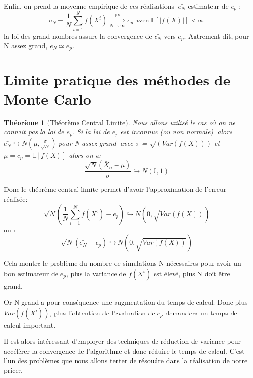 \documentclass[12pt]{report}
\newtheorem{theo}{Théorème}[section]
\begin{document}
Enfin, on prend la moyenne empirique de ces réalisations, $\bar{e_N}$ estimateur de $e_p$ :
\begin{equation}
	\bar{e_N}=\frac{1}{N}\sum_{i=1}^{N} f(X^i) \xrightarrow[N\rightarrow{\infty}]{\text{p.s}} e_p \text{~avec~} \mathbb{E}[|f(X)|]<\infty
\end{equation}
la loi des grand nombres assure la convergence de $\bar{e_N}$ vers $e_p$.
Autrement dit, pour N assez grand, $\bar{e_N} \simeq e_p$.

\section{Limite pratique des méthodes de Monte Carlo}

\begin{theo}[Théorème Central Limite]\label{TCL}
	Nous allons utilisé le cas où on ne connait pas la loi de $e_p$.
	Si la loi de $e_p$ est inconnue (ou non normale), alors $\bar{e_N}\hookrightarrow N(\mu,\frac{\sigma}{\sqrt{N}})$ pour N assez grand, avec $\sigma$ = $\sqrt{(Var(f(X)))}$  et $\mu=e_p =\mathbb{E}[f(X)]$  alors on a:
	\begin{equation}
		\frac{\sqrt{N}(\bar{X}_n-\mu)}{\sigma}\hookrightarrow N(0,1)
	\end{equation}
\end{theo}

Donc le théorème central limite permet d'avoir l'approximation de l'erreur réalisée:
\begin{equation}
	\label{eq:approximation-erreur}
	\sqrt{N}(\frac{1}{N}\sum_{i=1}^{N}f(X^i)-e_p)\hookrightarrow N(0,\sqrt{Var(f(X))})
\end{equation}
ou :
\begin{equation}
	\sqrt{N}(\bar{e_N}-e_p)\hookrightarrow N(0,\sqrt{Var(f(X))})
\end{equation}

Cela montre le problème du nombre de simulations N nécessaires pour avoir un bon estimateur de $e_p$, plus la variance de $f(X^i)$ est élevé, plus N doit être grand.

Or N grand a pour conséquence une augmentation du temps de calcul. Donc plus $Var(f(X^i))$, plus l’obtention de l’évaluation de $e_p$ demandera un temps de calcul important.

Il est alors intéressant d’employer des techniques de réduction de variance pour accélérer la convergence de l’algorithme et donc réduire le temps de calcul. C’est l’un des problèmes que nous allons tenter de résoudre dans la réalisation de notre pricer.
\end{document}
